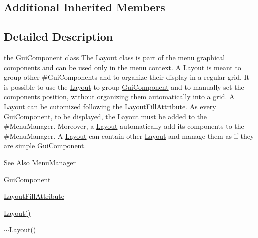 \subsection*{Additional Inherited Members}


\subsection{Detailed Description}
the \hyperlink{class_symp_1_1_gui_component_a22124675c2976983ac18374f81cc3fb3}{Gui\-Component} class The \hyperlink{class_symp_1_1_layout_acd02d4152c342a37567cbbdcec57814f}{Layout} class is part of the menu graphical components and can be used only in the menu context. A \hyperlink{class_symp_1_1_layout_acd02d4152c342a37567cbbdcec57814f}{Layout} is meant to group other \#\-Gui\-Components and to organize their display in a regular grid. It is possible to use the \hyperlink{class_symp_1_1_layout_acd02d4152c342a37567cbbdcec57814f}{Layout} to group \hyperlink{class_symp_1_1_gui_component_a22124675c2976983ac18374f81cc3fb3}{Gui\-Component} and to manually set the components position, without organizing them automatically into a grid. A \hyperlink{class_symp_1_1_layout_acd02d4152c342a37567cbbdcec57814f}{Layout} can be cutomized following the \hyperlink{namespace_symp_a30499696a7501e2c08fdf0b3094484fb}{Layout\-Fill\-Attribute}. As every \hyperlink{class_symp_1_1_gui_component_a22124675c2976983ac18374f81cc3fb3}{Gui\-Component}, to be displayed, the \hyperlink{class_symp_1_1_layout_acd02d4152c342a37567cbbdcec57814f}{Layout} must be added to the \#\-Menu\-Manager. Moreover, a \hyperlink{class_symp_1_1_layout_acd02d4152c342a37567cbbdcec57814f}{Layout} automatically add its components to the \#\-Menu\-Manager. A \hyperlink{class_symp_1_1_layout_acd02d4152c342a37567cbbdcec57814f}{Layout} can contain other \hyperlink{class_symp_1_1_layout_acd02d4152c342a37567cbbdcec57814f}{Layout} and manage them as if they are simple \hyperlink{class_symp_1_1_gui_component_a22124675c2976983ac18374f81cc3fb3}{Gui\-Component}. \begin{DoxySeeAlso}{See Also}
\hyperlink{class_symp_1_1_menu_manager}{Menu\-Manager} 

\hyperlink{class_symp_1_1_gui_component}{Gui\-Component} 

\hyperlink{namespace_symp_a30499696a7501e2c08fdf0b3094484fb}{Layout\-Fill\-Attribute} 

\hyperlink{class_symp_1_1_layout_acd02d4152c342a37567cbbdcec57814f}{Layout()} 

\hyperlink{class_symp_1_1_layout_a87402d517389b707ccc4cdbb06645ea5}{$\sim$\-Layout()} 
\end{DoxySeeAlso}


